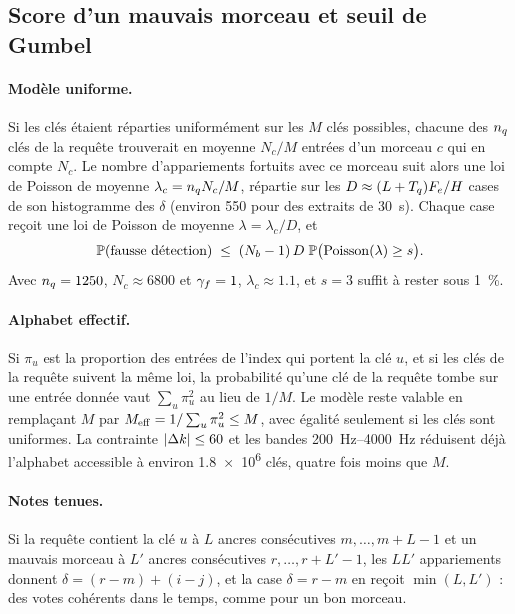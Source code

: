 \subsection{Score d'un mauvais morceau et seuil de Gumbel}
\label{sec-annexe-scores}

\paragraph{Modèle uniforme.} Si les clés étaient réparties uniformément sur les $M$ clés
possibles, chacune des $n_q$ clés de la requête trouverait en moyenne $N_c/M$ entrées d'un
morceau $c$ qui en compte $N_c$. Le nombre d'appariements fortuits avec ce morceau suit
alors une loi de Poisson de moyenne $\lambda_c = n_q N_c/M$, répartie sur les
$D \approx (L + T_q)F_e/H$ cases de son histogramme des $\delta$ (environ 550 pour des
extraits de \qty{30}{\second}). Chaque case reçoit une loi de Poisson de moyenne
$\lambda = \lambda_c/D$, et
\begin{equation}
  \mathbb{P}(\text{fausse détection}) \;\le\; (N_b - 1)\, D\; \mathbb{P}\bigl(\mathrm{Poisson}(\lambda) \ge s\bigr) .
  \label{eq-plancher}
\end{equation}
Avec $n_q = 1250$, $N_c \approx \num{6800}$ et $\gamma_f = 1$, $\lambda_c \approx \num{1.1}$, et
$s = 3$ suffit à rester sous \qty{1}{\percent}.

\paragraph{Alphabet effectif.} Si $\pi_u$ est la proportion des entrées de l'index qui
portent la clé $u$, et si les clés de la requête suivent la même loi, la probabilité qu'une
clé de la requête tombe sur une entrée donnée vaut $\sum_u \pi_u^2$ au lieu de $1/M$. Le
modèle reste valable en remplaçant $M$ par $M_{\mathrm{eff}} = 1/\sum_u \pi_u^2 \le M$, avec égalité
seulement si les clés sont uniformes. La contrainte $|\Delta k| \le 60$ et les bandes
\qtyrange{200}{4000}{\hertz} réduisent déjà l'alphabet accessible à environ \num{1.8e6} clés,
quatre fois moins que $M$.

\paragraph{Notes tenues.} Si la requête contient la clé $u$ à $L$ ancres consécutives
$m, \dots, m+L-1$ et un mauvais morceau à $L'$ ancres consécutives $r, \dots, r+L'-1$, les
$LL'$ appariements donnent $\delta = (r - m) + (i - j)$, et la case $\delta = r - m$ en reçoit
$\min(L, L')$ : des votes cohérents dans le temps, comme pour un bon morceau.


